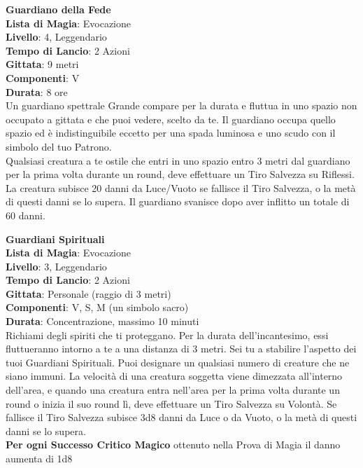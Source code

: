 \documentclass[a4paper,twoside,openany]{book}
\begin{document}
\begin{multicols}{2}
\medskip\textbf{Guardiano della Fede}\\
\textbf{Lista di Magia}: Evocazione\\
\textbf{Livello}: 4, Leggendario\\
\textbf{Tempo di Lancio}: 2 Azioni\\
\textbf{Gittata}: 9 metri\\
\textbf{Componenti}: V\\
\textbf{Durata}: 8 ore\\
Un guardiano spettrale Grande compare per la durata e fluttua in uno spazio non occupato a gittata e che puoi vedere, scelto da te. Il guardiano occupa quello spazio ed è indistinguibile eccetto per una spada luminosa e uno scudo con il simbolo del tuo Patrono.\\
Qualsiasi creatura a te ostile che entri in uno spazio entro 3 metri dal guardiano per la prima volta durante un round, deve effettuare un Tiro Salvezza su Riflessi. La creatura subisce 20 danni da Luce/Vuoto se fallisce il Tiro Salvezza, o la metà di questi danni se lo supera. Il guardiano svanisce dopo aver inflitto un totale di 60 danni.

\medskip\textbf{Guardiani Spirituali}\\
\textbf{Lista di Magia}: Evocazione\\
\textbf{Livello}: 3, Leggendario\\
\textbf{Tempo di Lancio}: 2 Azioni\\
\textbf{Gittata}: Personale (raggio di 3 metri)\\
\textbf{Componenti}: V, S, M (un simbolo sacro)\\
\textbf{Durata}: Concentrazione, massimo 10 minuti\\
Richiami degli spiriti che ti proteggano. Per la durata dell'incantesimo, essi fluttueranno intorno a te a una distanza di 3 metri. Sei tu a stabilire l'aspetto dei tuoi Guardiani Spirituali. Puoi designare un qualsiasi numero di creature che ne siano immuni. La velocità di una creatura soggetta viene dimezzata all'interno dell'area, e quando una creatura entra nell'area per la prima volta durante un round o inizia il suo round lì, deve effettuare un Tiro Salvezza su Volontà. Se fallisce il Tiro Salvezza subisce 3d8 danni da Luce o da Vuoto, o la metà di questi danni se lo supera.\\
\textbf{Per ogni Successo Critico Magico} ottenuto nella Prova di Magia il danno aumenta di 1d8


\end{multicols}
\end{document}
